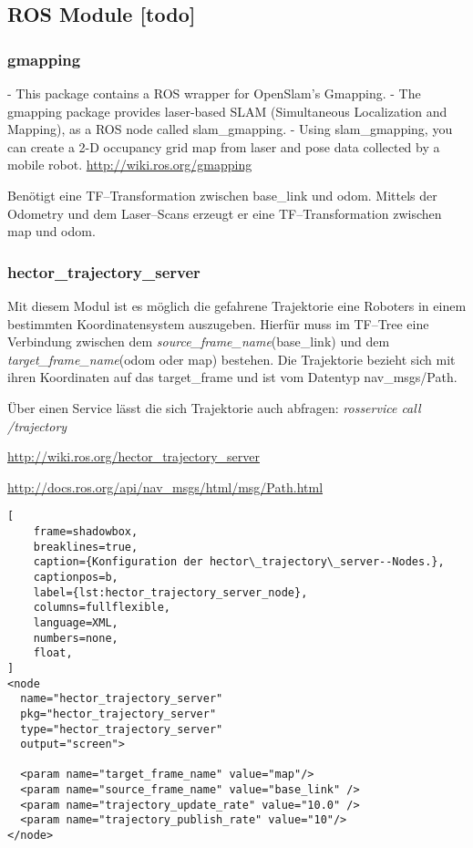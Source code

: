\subsection{ROS Module [todo]}


\begin{comment}
------------------------------------------------------------------------------------------
\end{comment}
\subsubsection{gmapping}

- This package contains a ROS wrapper for OpenSlam's Gmapping.
- The gmapping package provides laser-based SLAM (Simultaneous Localization and Mapping), as a ROS node called slam\_gmapping.
- Using slam\_gmapping, you can create a 2-D occupancy grid map from laser and pose data collected by a mobile robot.
\url{http://wiki.ros.org/gmapping}

Benötigt eine TF--Transformation zwischen base\_link und odom. Mittels der Odometry und dem Laser--Scans erzeugt er eine TF--Transformation zwischen map und odom.


\begin{comment}
------------------------------------------------------------------------------------------
\end{comment}
\subsubsection{hector\_trajectory\_server}

Mit diesem Modul ist es möglich die gefahrene Trajektorie eine Roboters in einem bestimmten Koordinatensystem auszugeben. Hierfür muss im TF--Tree eine Verbindung zwischen dem \textit{source\_frame\_name}(base\_link) und dem \textit{target\_frame\_name}(odom oder map) bestehen. Die Trajektorie bezieht sich mit ihren Koordinaten auf das target\_frame und ist vom Datentyp nav\_msgs/Path.

Über einen Service lässt die sich Trajektorie auch abfragen: \textit{rosservice call /trajectory}

\url{http://wiki.ros.org/hector_trajectory_server}

\url{http://docs.ros.org/api/nav_msgs/html/msg/Path.html}

\begin{lstlisting}[
	frame=shadowbox,
	breaklines=true,
	caption={Konfiguration der hector\_trajectory\_server--Nodes.},
	captionpos=b,
	label={lst:hector_trajectory_server_node},
	columns=fullflexible,
	language=XML,
	numbers=none,
	float,
]
<node 
  name="hector_trajectory_server"
  pkg="hector_trajectory_server"
  type="hector_trajectory_server"
  output="screen">

  <param name="target_frame_name" value="map"/>
  <param name="source_frame_name" value="base_link" />
  <param name="trajectory_update_rate" value="10.0" />
  <param name="trajectory_publish_rate" value="10"/>
</node>
\end{lstlisting}


